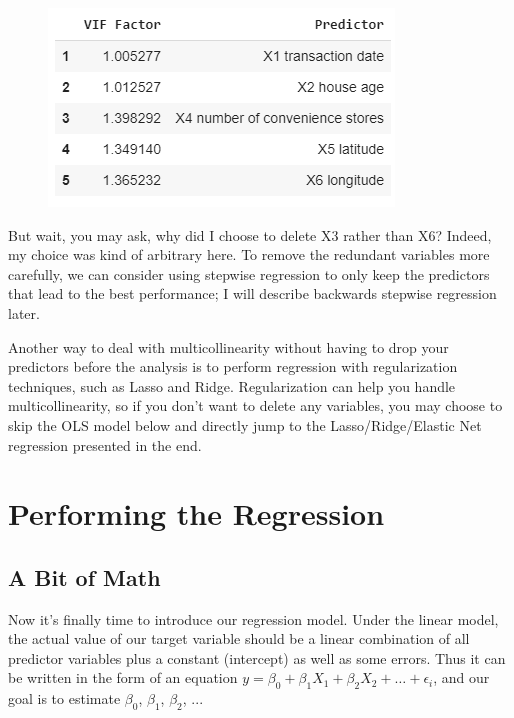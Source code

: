 \documentclass{article}
\begin{document}
\begin{figure}[H]\centering\includegraphics[width=0.5\linewidth]{13}\end{figure}
But wait, you may ask, why did I choose to delete X3 rather than X6? Indeed, my choice was kind of arbitrary here. To remove the redundant variables more carefully, we can consider using stepwise regression to only keep the predictors that lead to the best performance; I will describe backwards stepwise regression later.

Another way to deal with multicollinearity without having to drop your predictors before the analysis is to perform regression with regularization techniques, such as Lasso and Ridge. Regularization can help you handle multicollinearity, so if you don't want to delete any variables, you may choose to skip the OLS model below and directly jump to the Lasso/Ridge/Elastic Net regression presented in the end.

\section*{Performing the Regression}
\subsection*{A Bit of Math}
Now it's finally time to introduce our regression model. Under the linear model, the actual value of our target variable should be a linear combination of all predictor variables plus a constant (intercept) as well as some errors. Thus it can be written in the form of an equation $y = \beta_0 + \beta_1 X_1 + \beta_2 X_2 + \dots + \epsilon_i$, and our goal is to estimate $\beta_0$, $\beta_1$, $\beta_2$, ...
\end{document}
